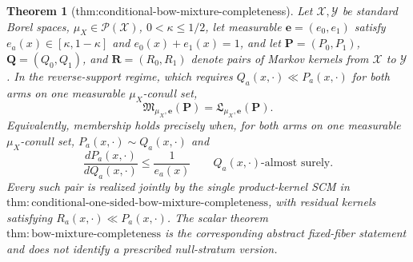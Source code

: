 \documentclass{article}
\newtheorem{theorem}{Theorem}
\begin{document}
\begin{theorem}[thm:conditional-bow-mixture-completeness]\label{thm:conditional-bow-mixture-completeness}
Let \(\mathcal X,\mathcal Y\) be standard Borel spaces, \(\mu_X\in\mathcal P(\mathcal X)\), \(0<\kappa\le1/2\), let measurable \(\boldsymbol e=(e_0,e_1)\) satisfy \(e_a(x)\in[\kappa,1-\kappa]\) and \(e_0(x)+e_1(x)=1\), and let \(\boldsymbol P=(P_0,P_1)\), \(\boldsymbol Q=(Q_0,Q_1)\), and \(\boldsymbol R=(R_0,R_1)\) denote pairs of Markov kernels from \(\mathcal X\) to \(\mathcal Y\).  In the reverse-support regime, which requires \(Q_a(x,\cdot)\ll P_a(x,\cdot)\) for both arms on one measurable \(\mu_X\)-conull set,
\[
 \mathfrak M_{\mu_X,\boldsymbol e}(\boldsymbol P)=\mathfrak L_{\mu_X,\boldsymbol e}(\boldsymbol P).
\]
Equivalently, membership holds precisely when, for both arms on one measurable \(\mu_X\)-conull set, \(P_a(x,\cdot)\sim Q_a(x,\cdot)\) and
\[
 \frac{dP_a(x,\cdot)}{dQ_a(x,\cdot)}\le\frac1{e_a(x)}\qquad Q_a(x,\cdot)\text{-almost surely}.
\]
Every such pair is realized jointly by the single product-kernel SCM in \(\mathrm{thm:conditional\text{-}one\text{-}sided\text{-}bow\text{-}mixture\text{-}completeness}\), with residual kernels satisfying \(R_a(x,\cdot)\ll P_a(x,\cdot)\).  The scalar theorem \(\mathrm{thm:bow\text{-}mixture\text{-}completeness}\) is the corresponding abstract fixed-fiber statement and does not identify a prescribed null-stratum version.
\end{theorem}
\end{document}
